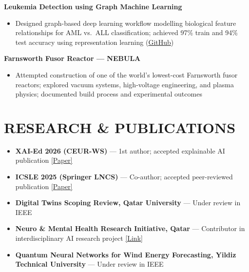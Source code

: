 \documentclass[letterpaper,8.5pt]{article}
\newcommand{\resumeItem}[1]{
  \item \small{#1}
}
\newcommand{\resumeProjectHeading}[1]{
  \vspace{1pt}
  \textbf{\small #1}
  \vspace{-3pt}
}
\begin{document}
\resumeProjectHeading{Leukemia Detection using Graph Machine Learning}
\begin{itemize}
\resumeItem{Designed graph-based deep learning workflow modelling biological feature relationships for AML vs.\ ALL classification; achieved 97\% train and 94\% test accuracy using representation learning (\href{https://github.com/92meharali}{GitHub})}
\end{itemize}

\resumeProjectHeading{Farnsworth Fusor Reactor \textnormal{— NEBULA}}
\begin{itemize}
\resumeItem{Attempted construction of one of the world's lowest-cost Farnsworth fusor reactors; explored vacuum systems, high-voltage engineering, and plasma physics; documented build process and experimental outcomes}
\end{itemize}

\section{RESEARCH \& PUBLICATIONS}
\begin{itemize}
\resumeItem{\textbf{XAI-Ed 2026 (CEUR-WS)} — 1st author; accepted explainable AI publication \href{https://www.xai-ed.net/papers/XAI-Ed_2026_paper_1.pdf}{[Paper]}}
\resumeItem{\textbf{ICSLE 2025 (Springer LNCS)} — Co-author; accepted peer-reviewed publication \href{https://www.researchgate.net/profile/Awais-Baig-3/publication/395837132_Barrier-Based_Inclusive_Design_in_VR_Addressing_DEI_Challenges_through_the_UDL_30_Framework/links/68d55eee220a341aa14f3264/Barrier-Based-Inclusive-Design-in-VR-Addressing-DEI-Challenges-through-the-UDL-30-Framework.pdf}{[Paper]}}
\resumeItem{\textbf{Digital Twins Scoping Review, Qatar University} — Under review in IEEE}
\resumeItem{\textbf{Neuro \& Mental Health Research Initiative, Qatar} — Contributor in interdisciplinary AI research project \href{https://www.linkedin.com/feed/update/urn:li:activity:7424050684309917696/}{[Link]}}
\resumeItem{\textbf{Quantum Neural Networks for Wind Energy Forecasting, Yildiz Technical University} — Under review in IEEE}
\end{itemize}

\end{document}
